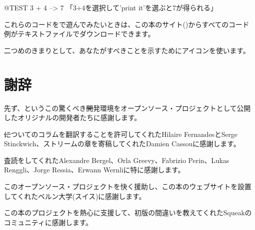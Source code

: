 \documentclass[a4paper,10pt,twoside]{book}
\begin{document}
\begin{code}{@TEST}
3 + 4 --> 7    「3+4を選択して'print it'を選ぶと7が得られる」
\end{code}

これらのコードを\pharo で遊んでみたいときは、この本のサイト(\pbe)からすべてのコード例がテキストファイルでダウンロードできます。

二つめのきまりとして、あなたがすべきことを示すために\dothisicon{}アイコンを使います。


\section*{謝辞}

先ず、\squeak というこの驚くべき\st 開発環境をオープンソース・プロジェクトとして公開したオリジナルの開発者たちに感謝します。

\st についてのコラムを翻訳することを許可してくれたHilaire FernandesとSerge Stinckwich、ストリームの章を寄稿してくれたDamien Cassouに感謝します。

査読をしてくれたAlexandre Bergel、Orla Greevy、Fabrizio Perin、Lukas Renggli、Jorge Ressia、Erwann Wernliに特に感謝します。

このオープンソース・プロジェクトを快く援助し、この本のウェブサイトを設置してくれたベルン大学(スイス)に感謝します。

この本のプロジェクトを熱心に支援して、初版の間違いを教えてくれたSqueakのコミュニティに感謝します。

\ifx\wholebook\relax\else
   
   
\end{document}
